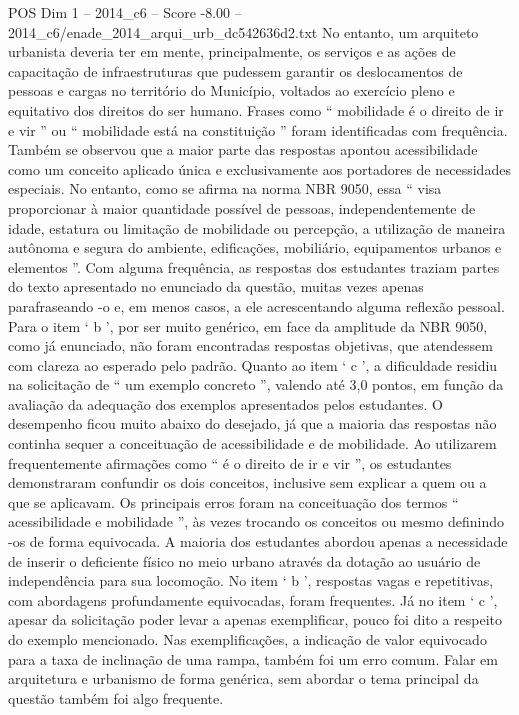 \begin{textsample}{POS Dim 1 – 2014\_c6 – Score -8.00 – 2014\_c6/enade\_2014\_arqui\_urb\_dc542636d2.txt}
No entanto, um arquiteto urbanista deveria ter em mente, principalmente, os serviços e as ações de capacitação de infraestruturas que pudessem garantir os deslocamentos de pessoas e cargas no território do Município, voltados ao exercício pleno e equitativo dos direitos do ser humano.
Frases como “ mobilidade é o direito de ir e vir ” ou “ mobilidade está na constituição ” foram identificadas com frequência.
Também se observou que a maior parte das respostas apontou acessibilidade como um conceito aplicado única e exclusivamente aos portadores de necessidades especiais.
No entanto, como se afirma na norma NBR 9050, essa “ visa proporcionar à maior quantidade possível de pessoas, independentemente de idade, estatura ou limitação de mobilidade ou percepção, a utilização de maneira autônoma e segura do ambiente, edificações, mobiliário, equipamentos urbanos e elementos ”.
Com alguma frequência, as respostas dos estudantes traziam partes do texto apresentado no enunciado da questão, muitas vezes apenas parafraseando -o e, em menos casos, a ele acrescentando alguma reflexão pessoal.
Para o item ‘ b ’, por ser muito genérico, em face da amplitude da NBR 9050, como já enunciado, não foram encontradas respostas objetivas, que atendessem com clareza ao esperado pelo padrão.
Quanto ao item ‘ c ’, a dificuldade residiu na solicitação de “ um exemplo concreto ”, valendo até 3,0 pontos, em função da avaliação da adequação dos exemplos apresentados pelos estudantes.
O desempenho ficou muito abaixo do desejado, já que a maioria das respostas não continha sequer a conceituação de acessibilidade e de mobilidade.
Ao utilizarem frequentemente afirmações como “ é o direito de ir e vir ”, os estudantes demonstraram confundir os dois conceitos, inclusive sem explicar a quem ou a que se aplicavam.
Os principais erros foram na conceituação dos termos “ acessibilidade e mobilidade ”, às vezes trocando os conceitos ou mesmo definindo -os de forma equivocada.
A maioria dos estudantes abordou apenas a necessidade de inserir o deficiente físico no meio urbano através da dotação ao usuário de independência para sua locomoção.
No item ‘ b ’, respostas vagas e repetitivas, com abordagens profundamente equivocadas, foram frequentes.
Já no item ‘ c ’, apesar da solicitação poder levar a apenas exemplificar, pouco foi dito a respeito do exemplo mencionado.
Nas exemplificações, a indicação de valor equivocado para a taxa de inclinação de uma rampa, também foi um erro comum.
Falar em arquitetura e urbanismo de forma genérica, sem abordar o tema principal da questão também foi algo frequente.

\end{textsample}
